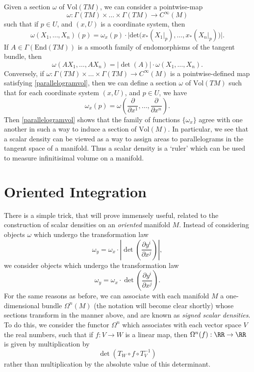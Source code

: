 Given a section $\omega$ of $\text{Vol}(TM)$, we can consider a pointwise-map
%
\[ \omega: \Gamma(TM) \times \dots \times \Gamma(TM) \to C^\infty(M) \]
%
such that if $p \in U$, and $(x,U)$ is a coordinate system, then
%
\[ \omega(X_1, \dots, X_n)(p) = \omega_x(p) \cdot \big|\text{det} \big(x_*(X_1|_p), \dots, x_*(X_n|_p) \big) \big|. \]
%
If $A \in \Gamma(\text{End}(TM))$ is a smooth family of endomorphisms of the tangent bundle, then
%
\begin{equation} \label{parallelogramvol} \omega(A X_1, \dots, A X_n) = |\det(A)| \cdot \omega(X_1, \dots, X_n). \end{equation}
%
Conversely, if $\omega: \Gamma(TM) \times \dots \times \Gamma(TM) \to C^\infty(M)$ is a pointwise-defined map satisfying \eqref{parallelogramvol}, then we can define a section $\omega$ of $\text{Vol}(TM)$ such that for each coordinate system $(x,U)$, and $p \in U$, we have
%
\[ \omega_x(p) = \omega \left( \frac{\partial}{\partial x^1}, \dots, \frac{\partial}{\partial x^n} \right). \]
%
Then \eqref{parallelogramvol} shows that the family of functions $\{ \omega_x \}$ agree with one another in such a way to induce a section of $\text{Vol}(M)$. In particular, we see that a scalar density can be viewed as a way to assign areas to parallelograms in the tangent space of a manifold. Thus a scalar density is a `ruler' which can be used to measure infinitisimal volume on a manifold.

\section{Oriented Integration}

There is a simple trick, that will prove immensely useful, related to the construction of scalar densities on an \emph{oriented} manifold $M$. Instead of considering objects $\omega$ which undergo the transformation law
%
\[ \omega_y = \omega_x \cdot \left| \det \left( \frac{\partial y^i}{\partial x^j} \right) \right|, \]
%
we consider objects which undergo the transformation law
%
\[ \omega_y = \omega_x \cdot \det \left( \frac{\partial y^i}{\partial x^j} \right). \]
%
For the same reasons as before, we can associate with each manifold $M$ a one-dimensional bundle $\Omega^n(M)$ (the notation will become clear shortly) whose sections transform in the manner above, and are known as \emph{signed scalar densities}. To do this, we consider the functor $\Omega^n$ which associates with each vector space $V$ the real numbers, such that if $f: V \to W$ is a linear map, then $\Omega^n(f): \RR \to \RR$ is given by multiplication by
%
\[ \det(T_W \circ f \circ T_V^{-1}) \]
%
rather than multiplication by the absolute value of this determinant.

